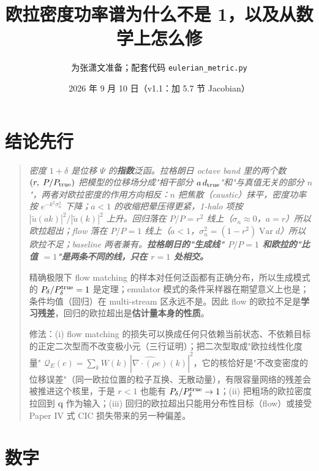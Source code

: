 \documentclass[11pt,UTF8,fontset=none]{ctexart}
\title{欧拉密度功率谱为什么不是 1，以及从数学上怎么修}
\author{为张潇文准备；配套代码 \texttt{eulerian\_metric.py}}
\date{2026 年 9 月 10 日（v1.1：加 5.7 节 Jacobian）}
\newcommand{\q}{\mathbf{q}}
\newcommand{\Var}{\operatorname{Var}}
\newcommand{\Pd}{P_\delta}
\newcommand{\QE}{\mathcal Q_E}
\begin{document}
\maketitle

\section*{结论先行}

\begin{quote}\itshape
密度 $1+\delta$ 是位移 $\Psi$ 的\textbf{指数}泛函。拉格朗日 octave band 里的两个数 $(r,\;P/P_{\rm true})$ 把模型的位移场分成"相干部分 $a\,d_{\rm true}$"和"与真值无关的部分 $n$"，两者对欧拉密度的作用方向相反：$n$ 把焦散（caustic）抹平，密度功率按 $e^{-k^2\sigma_n^2}$ 下降；$a<1$ 的收缩把晕压得更紧，1-halo 项按 $|\tilde u(ak)|^2/|\tilde u(k)|^2$ 上升。回归落在 $P/P=r^2$ 线上（$\sigma_n\approx0$，$a=r$）所以欧拉超出；flow 落在 $P/P=1$ 线上（$a<1$，$\sigma_n^2=(1-r^2)\Var d$）所以欧拉不足；baseline 两者兼有。\textbf{拉格朗日的"生成线" $P/P=1$ 和欧拉的"比值 $=1$"是两条不同的线，只在 $r=1$ 处相交。}

精确极限下 flow matching 的样本对任何泛函都有正确分布，所以生成模式的 $\Pd/\Pd^{\rm true}=1$ 是定理；emulator 模式的条件采样器在期望意义上也是；条件均值（回归）在 multi-stream 区永远不是。因此 flow 的欧拉不足是\textbf{学习残差}，回归的欧拉超出是\textbf{估计量本身的性质}。

修法：(i) flow matching 的损失可以换成任何只依赖当前状态、不依赖目标的正定二次型而不改变极小元（三行证明）；把二次型取成"欧拉线性化度量" $\QE(e)=\sum_k W(k)\,|\widehat{\nabla\!\cdot(\rho e)}(k)|^2$，它的核恰好是"不改变密度的位移误差"（同一欧拉位置的粒子互换、无散动量），有限容量网络的残差会被推进这个核里，于是 $r<1$ 也能有 $\Pd/\Pd^{\rm true}\to1$；(ii) 把粗场的欧拉密度拉回到 $\q$ 作为输入；(iii) 回归的欧拉超出只能用分布性目标（flow）或接受 Paper IV 式 CIC 损失带来的另一种偏差。
\end{quote}

\section{数字}
\end{document}
